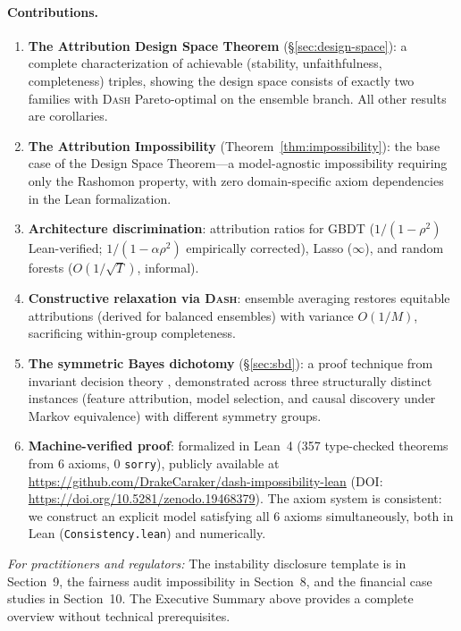 \documentclass{article}
\newcommand{\DASH}{\textsc{Dash}}
\newcommand{\GBDT}{\textsc{GBDT}}
\begin{document}
\paragraph{Contributions.}
\begin{sloppypar}
\begin{enumerate}
    \item \textbf{The Attribution Design Space Theorem} (\S\ref{sec:design-space}):
    a complete characterization of achievable (stability, unfaithfulness, completeness)
    triples, showing the design space consists of exactly two families with \DASH{}
    Pareto-optimal on the ensemble branch. All other results are corollaries.
    \item \textbf{The Attribution Impossibility} (Theorem~\ref{thm:impossibility}):
    the base case of the Design Space Theorem---a model-agnostic impossibility
    requiring only the Rashomon property, with zero domain-specific axiom dependencies in the Lean
    formalization.
    \item \textbf{Architecture discrimination}: attribution ratios for \GBDT{}
    ($1/(1{-}\rho^2)$ Lean-verified; $1/(1{-}\alpha\rho^2)$ empirically corrected),
    Lasso ($\infty$), and random forests ($O(1/\sqrt{T})$, informal).
    \item \textbf{Constructive relaxation via \DASH{}}: ensemble averaging restores
    equitable attributions (derived for balanced ensembles) with variance $O(1/M)$,
    sacrificing within-group completeness.
    \item \textbf{The symmetric Bayes dichotomy} (\S\ref{sec:sbd}): a proof technique
    from invariant decision theory \citep{lehmann2005testing}, demonstrated across three
    structurally distinct instances (feature attribution, model selection, and causal
    discovery under Markov equivalence) with different symmetry groups.
    \item \textbf{Machine-verified proof}: formalized in Lean~4 (357 type-checked theorems from 6 axioms, 0 \texttt{sorry}), publicly available at \url{https://github.com/DrakeCaraker/dash-impossibility-lean} (DOI: \url{https://doi.org/10.5281/zenodo.19468379}). The axiom system is consistent: we construct an explicit model satisfying all 6 axioms simultaneously, both in Lean (\texttt{Consistency.lean}) and numerically.
\end{enumerate}
\end{sloppypar}

\noindent\textit{For practitioners and regulators:} The instability disclosure template is in Section~9, the fairness audit impossibility in Section~8, and the financial case studies in Section~10. The Executive Summary above provides a complete overview without technical prerequisites.
\end{document}

